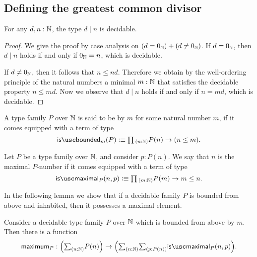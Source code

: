 \subsection{Defining the greatest common divisor}

\begin{lem}
  For any $d,n:{\mathbb{N}}$, the type $d\mid n$ is decidable.
\end{lem}

\begin{proof}
  We give the proof by case analysis on $(d=0_{{\mathbb{N}}})+(d\neq0_{{\mathbb{N}}})$. If $d=0_{{\mathbb{N}}}$, then $d\mid n$ holds if and only if $0_{{\mathbb{N}}}=n$, which is decidable.

  If $d\neq0_{{\mathbb{N}}}$, then it follows that $n\leq nd$. Therefore we obtain by the well-ordering principle of the natural numbers a minimal $m:{\mathbb{N}}$ that satisfies the decidable property $n\leq md$. Now we observe that $d\mid n$ holds if and only if $n=md$, which is decidable.
\end{proof}

\begin{defn}
  A type family $P$ over ${\mathbb{N}}$ is said to be  by $m$ for some natural number $m$, if it comes equipped with a term of type
  \begin{equation*}
    \isbounded_m(P) \defeq \prd{n:\N}P(n)\to (n\leq m).
  \end{equation*}
\end{defn}

\begin{defn}
  Let $P$ be a type family over ${\mathbb{N}}$, and consider $p:P(n)$. We say that $n$ is the maximal $P$-number if it comes equipped with a term of type
  \begin{equation*}
    \ismaximal_P(n,p) \defeq \prd{m:\N} P(m)\to m\leq n.
  \end{equation*}
\end{defn}

In the following lemma we show that if a decidable family $P$ is bounded from above and inhabited, then it possesses a maximal element.

\begin{lem}\label{lem:maximal}
  Consider a decidable type family $P$ over ${\mathbb{N}}$ which is bounded from above by $m$. Then there is a function
  \begin{equation*}
    \maximum_P:\Big(\sm{n:\N}P(n)\Big)\to\Big(\sm{n:\N}{p:P(n)}\ismaximal_P(n,p)\Big).
  \end{equation*}
\end{lem}

